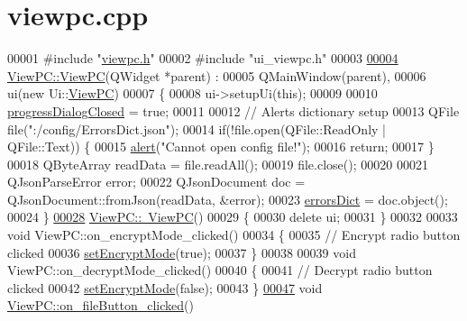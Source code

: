 \hypertarget{viewpc_8cpp_source}{\section{viewpc.\-cpp}
}

\begin{DoxyCode}
00001 \textcolor{preprocessor}{#include "\hyperlink{viewpc_8h}{viewpc.h}"}
00002 \textcolor{preprocessor}{#include "ui\_viewpc.h"}
00003 
\hypertarget{viewpc_8cpp_source_l00004}{}\hyperlink{class_view_p_c_a33c96c61f61042319c66c19059836b7f}{00004} \hyperlink{class_view_p_c_a33c96c61f61042319c66c19059836b7f}{ViewPC::ViewPC}(QWidget *parent) :
00005     QMainWindow(parent),
00006     ui(new Ui::\hyperlink{class_view_p_c}{ViewPC})
00007 \{
00008     ui->setupUi(\textcolor{keyword}{this});
00009 
00010     \hyperlink{class_view_p_c_add8c82aa2b0b934212aa5bde9277ab36}{progressDialogClosed} = \textcolor{keyword}{true};
00011 
00012     \textcolor{comment}{// Alerts dictionary setup}
00013     QFile file(\textcolor{stringliteral}{":/config/ErrorsDict.json"});
00014     \textcolor{keywordflow}{if}(!file.open(QFile::ReadOnly | QFile::Text)) \{
00015         \hyperlink{class_view_p_c_a7c467169467789561078abc9d4fe57bd}{alert}(\textcolor{stringliteral}{"Cannot open config file!"});
00016         \textcolor{keywordflow}{return};
00017     \}
00018     QByteArray readData = file.readAll();
00019     file.close();
00020 
00021     QJsonParseError error;
00022     QJsonDocument doc = QJsonDocument::fromJson(readData, &error);
00023     \hyperlink{class_view_p_c_a26f90436aca32e5bad46f5e69a7e7e09}{errorsDict} = doc.object();
00024 \}
\hypertarget{viewpc_8cpp_source_l00028}{}\hyperlink{class_view_p_c_a91c51f5c1e6ed5ab12b410339f469b0f}{00028} \hyperlink{class_view_p_c_a91c51f5c1e6ed5ab12b410339f469b0f}{ViewPC::~ViewPC}()
00029 \{
00030     \textcolor{keyword}{delete} ui;
00031 \}
00032 
00033 \textcolor{keywordtype}{void} ViewPC::on\_encryptMode\_clicked()
00034 \{
00035     \textcolor{comment}{// Encrypt radio button clicked}
00036     \hyperlink{class_view_p_c_a5b48951efefdc0e3039c9a4bf185320b}{setEncryptMode}(\textcolor{keyword}{true});
00037 \}
00038 
00039 \textcolor{keywordtype}{void} ViewPC::on\_decryptMode\_clicked()
00040 \{
00041     \textcolor{comment}{// Decrypt radio button clicked}
00042     \hyperlink{class_view_p_c_a5b48951efefdc0e3039c9a4bf185320b}{setEncryptMode}(\textcolor{keyword}{false});
00043 \}
\hypertarget{viewpc_8cpp_source_l00047}{}\hyperlink{class_view_p_c_a3b9b7a7be9702d8b160f257f1c74a776}{00047} \textcolor{keywordtype}{void} \hyperlink{class_view_p_c_a3b9b7a7be9702d8b160f257f1c74a776}{ViewPC::on\_fileButton\_clicked}()

\end{DoxyCode}
